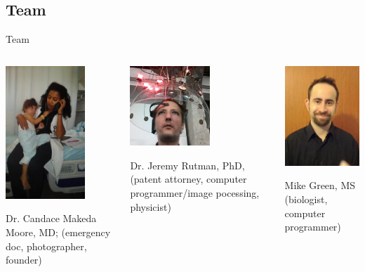 \documentclass[presentation]{beamer}
\begin{document}
\subsection{Team}
\label{sec-1-7}
\begin{frame}[label=sec-1-7-1]{Team}
\begin{columns}
\begin{column}{0.3\textwidth}
\includegraphics[width=3.0cm]{./presentation-images/makeda.jpeg}

Dr. Candace Makeda Moore, MD; (emergency doc, photographer,
founder)

\vspace{\fill}
\end{column}

\begin{column}{0.3\textwidth}
\includegraphics[width=3.0cm]{./presentation-images/jeremy-rutman.jpeg}

Dr. Jeremy Rutman, PhD, (patent attorney, computer
programmer/image pocessing, physicist)

\vspace{1.0cm}
\end{column}

\begin{column}{0.3\textwidth}
\includegraphics[width=3.0cm]{./presentation-images/mike-green.jpeg}

Mike Green, MS (biologist, computer programmer)

\vspace{2.0cm}
\end{column}
\end{columns}
\end{frame}
\end{document}
